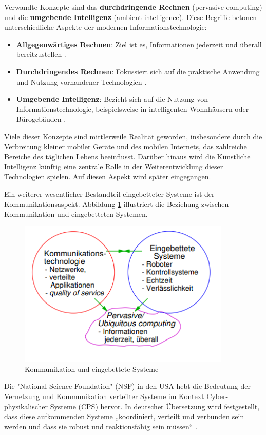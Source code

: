 Verwandte Konzepte sind das \textbf{durchdringende Rechnen} (pervasive computing) und die \textbf{umgebende Intelligenz} (ambient intelligence). Diese Begriffe betonen unterschiedliche Aspekte der modernen Informationstechnologie:  
\begin{itemize}
    \item \textbf{Allgegenwärtiges Rechnen}: Ziel ist es, Informationen jederzeit und überall bereitzustellen \cite{Ubiquitous_Computing_1994}.  
    \item \textbf{Durchdringendes Rechnen}: Fokussiert sich auf die praktische Anwendung und Nutzung vorhandener Technologien \cite{Ubiquitous_Computing_1994}.  
    \item \textbf{Umgebende Intelligenz}: Bezieht sich auf die Nutzung von Informationstechnologie, beispielsweise in intelligenten Wohnhäusern oder Bürogebäuden \cite{Ubiquitous_Computing_1994}.
\end{itemize}  

Viele dieser Konzepte sind mittlerweile Realität geworden, insbesondere durch die Verbreitung kleiner mobiler Geräte und des mobilen Internets, das zahlreiche Bereiche des täglichen Lebens beeinflusst. Darüber hinaus wird die Künstliche Intelligenz künftig eine zentrale Rolle in der Weiterentwicklung dieser Technologien spielen. Auf diesen Aspekt wird später eingegangen.  

Ein weiterer wesentlicher Bestandteil eingebetteter Systeme ist der Kommunikationsaspekt. Abbildung \ref{fig:kommunikation} illustriert die Beziehung zwischen Kommunikation und eingebetteten Systemen.  
\begin{figure}[h]
	\centering
	\includegraphics[width=0.9\textwidth]{img/kommunikation.png}
	\caption{Kommunikation und eingebettete Systeme \cite{Marwedel.2021}}
	\label{fig:kommunikation}
\end{figure}
Die "National Science Foundation" (NSF) in den USA hebt die Bedeutung der Vernetzung und Kommunikation verteilter Systeme im Kontext Cyber-physikalischer Systeme (CPS) hervor. In deutscher Übersetzung wird festgestellt, dass diese aufkommenden Systeme „koordiniert, verteilt und verbunden sein werden und dass sie robust und reaktionsfähig sein müssen“ \cite{Council.2015}.  

